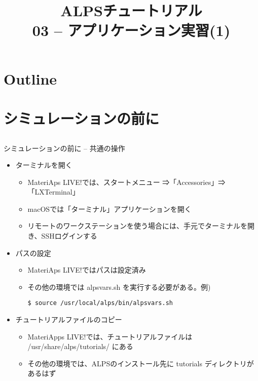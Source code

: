 
\title{ALPSチュートリアル \\ 03 -- アプリケーション実習(1)}




\begin{frame}
  \titlepage
\end{frame}

\section*{Outline}
\begin{frame}[t,fragile]
   \tableofcontents
\end{frame}

\section{シミュレーションの前に}

\subsection*{\redb\whiteb\greenm}
\begin{frame}[t,fragile]{シミュレーションの前に -- 共通の操作}
  \begin{itemize}
  \item ターミナルを開く
    \begin{itemize}
    \item \alert{MateriAps LIVE!では、スタートメニュー ⇒「Accessories」⇒「LXTerminal」}
    \item macOSでは「ターミナル」アプリケーションを開く
    \item リモートのワークステーションを使う場合には、手元でターミナルを開き、SSHログインする
    \end{itemize}

  \item パスの設定
    \begin{itemize}
    \item \alert{MateriAps LIVE!ではパスは設定済み}
    \item その他の環境では alpsvars.sh を実行する必要がある。例)
\begin{lstlisting}
$ source /usr/local/alps/bin/alpsvars.sh
\end{lstlisting}
    \end{itemize}
    
  \item チュートリアルファイルのコピー
    \begin{itemize}
    \item \alert{MateriApps LIVE!では、チュートリアルファイルは /usr/share/alps/tutorials/ にある}
    \item その他の環境では、ALPSのインストール先に tutorials ディレクトリがあるはず
    \end{itemize}
  \end{itemize}
\end{frame}

